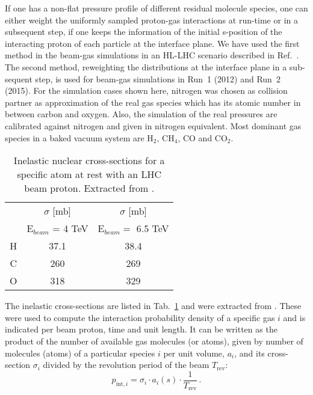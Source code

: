 If one has a non-flat pressure profile of different residual molecule species, one can either weight the uniformly sampled proton-gas interactions at run-time or in a subsequent step, if one keeps the information of the initial s-position of the interacting proton of each particle at the interface plane. We have used the first method in the beam-gas simulations in an HL-LHC scenario described in Ref.~\cite{kweeIpac14}. The second method, reweighting the distributions at the interface plane in a sub-sequent step, is used for beam-gas simulations in Run~1 (2012) and Run~2 (2015). For the simulation cases shown here, nitrogen was chosen as collision partner as approximation of the real gas species which has its atomic number in between carbon and oxygen. Also, the simulation of the real pressures are calibrated against nitrogen and given in nitrogen equivalent. Most dominant gas species in a baked vacuum system are H$_2$, CH$_4$, CO and CO$_2$.

\begin{table}
   \centering
   \caption{Inelastic nuclear cross-sections for a specific atom at rest with an LHC beam proton. Extracted from \fluka.}
   \begin{tabular}{c|c|c}\hline
     &  $\sigma$ [mb] &  $\sigma$ [mb] \\
       & E$_{beam}$ = 4 TeV   & E$_{beam} =$ 6.5 TeV \\ \hline\hline
       H & 37.1 & 38.4 \\
       C & 260& 269 \\
       O & 318 & 329 \\
       \hline
   \end{tabular}
   \label{tab:atomicXsections}
\end{table}

The inelastic cross-sections are listed in Tab.~\ref{tab:atomicXsections} and were extracted from \fluka. %
These were used to compute the interaction probability density of a specific gas $i$ and is indicated per beam proton, time and unit length. It can be written as the product of the number of available gas molecules (or atoms), given by number of molecules (atoms) of a particular species $i$ per unit volume, $a_{i}$, and its cross-section $\sigma_i$ divided by the revolution period of the beam $T_{\mathrm{rev}}$:
\begin{equation} \label{eq2}
p_{\mathrm{int},i} = \sigma_{i} \cdot a_{i}(s) \cdot \frac{1}{T_{\mathrm{rev}}} \, .
\end{equation}

